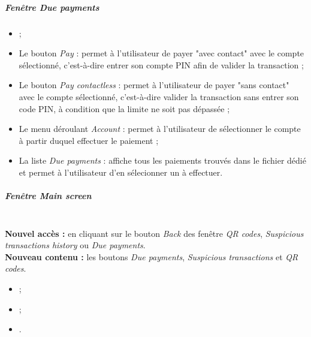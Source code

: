 \subparagraph{Fenêtre \emph{Due payments}}
\begin{itemize}
\item {} ;
\item Le bouton \emph{Pay} : permet à l'utilisateur de payer "avec contact" avec le compte sélectionné, c'est-à-dire entrer son compte PIN afin de valider la transaction ;
\item Le bouton \emph{Pay contactless} : permet à l'utilisateur de payer "sans contact" avec le compte sélectionné, c'est-à-dire valider la transaction sans entrer son code PIN, à condition que la limite ne soit pas dépassée ;
\item Le menu déroulant \emph{Account} : permet à l'utilisateur de sélectionner le compte à partir duquel effectuer le paiement ;
\item La liste \emph{Due payments} : affiche tous les paiements trouvés dans le fichier dédié et permet à l'utilisateur d'en sélecionner un à effectuer.
\end{itemize}


\subparagraph{Fenêtre \emph{Main screen}}
\ \\ \noindent\textbf{Nouvel accès :} en cliquant sur le bouton \emph{Back} des fenêtre \emph{QR codes}, \emph{Suspicious transactions history} ou \emph{Due payments}.
\ \\ \textbf{Nouveau contenu :} les boutons \emph{Due payments}, \emph{Suspicious transactions} et \emph{QR codes}.
\begin{itemize}
\item {} ;
\item {} ;
\item {}.
\end{itemize}

